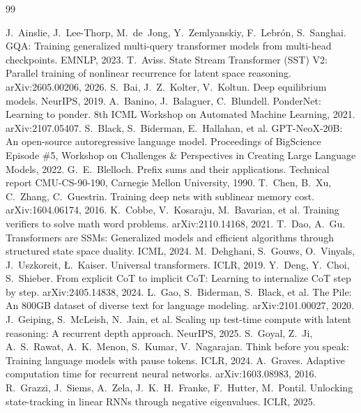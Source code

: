 \documentclass[10pt]{article}
\begin{document}
\begin{thebibliography}{99}
\setlength{\itemsep}{0.5pt}

 J.~Ainslie, J.~Lee-Thorp, M.~de~Jong, Y.~Zemlyanskiy, F.~Lebr\'on, S.~Sanghai. GQA: Training generalized multi-query transformer models from multi-head checkpoints. EMNLP, 2023.
 T.~Aviss. State Stream Transformer (SST) V2: Parallel training of nonlinear recurrence for latent space reasoning. arXiv:2605.00206, 2026.
 S.~Bai, J.~Z.~Kolter, V.~Koltun. Deep equilibrium models. NeurIPS, 2019.
 A.~Banino, J.~Balaguer, C.~Blundell. PonderNet: Learning to ponder. 8th ICML Workshop on Automated Machine Learning, 2021. arXiv:2107.05407.
 S.~Black, S.~Biderman, E.~Hallahan, et al. GPT-NeoX-20B: An open-source autoregressive language model. Proceedings of BigScience Episode \#5, Workshop on Challenges \& Perspectives in Creating Large Language Models, 2022.
 G.~E.~Blelloch. Prefix sums and their applications. Technical report CMU-CS-90-190, Carnegie Mellon University, 1990.
 T.~Chen, B.~Xu, C.~Zhang, C.~Guestrin. Training deep nets with sublinear memory cost. arXiv:1604.06174, 2016.
 K.~Cobbe, V.~Kosaraju, M.~Bavarian, et al. Training verifiers to solve math word problems. arXiv:2110.14168, 2021.
 T.~Dao, A.~Gu. Transformers are SSMs: Generalized models and efficient algorithms through structured state space duality. ICML, 2024.
 M.~Dehghani, S.~Gouws, O.~Vinyals, J.~Uszkoreit, \L.~Kaiser. Universal transformers. ICLR, 2019.
 Y.~Deng, Y.~Choi, S.~Shieber. From explicit CoT to implicit CoT: Learning to internalize CoT step by step. arXiv:2405.14838, 2024.
 L.~Gao, S.~Biderman, S.~Black, et al. The Pile: An 800GB dataset of diverse text for language modeling. arXiv:2101.00027, 2020.
 J.~Geiping, S.~McLeish, N.~Jain, et al. Scaling up test-time compute with latent reasoning: A recurrent depth approach. NeurIPS, 2025.
 S.~Goyal, Z.~Ji, A.~S.~Rawat, A.~K.~Menon, S.~Kumar, V.~Nagarajan. Think before you speak: Training language models with pause tokens. ICLR, 2024.
 A.~Graves. Adaptive computation time for recurrent neural networks. arXiv:1603.08983, 2016.
 R.~Grazzi, J.~Siems, A.~Zela, J.~K.~H.~Franke, F.~Hutter, M.~Pontil. Unlocking state-tracking in linear RNNs through negative eigenvalues. ICLR, 2025.

\end{thebibliography}
\end{document}
